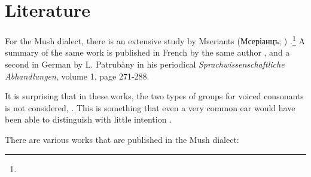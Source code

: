 \section{Literature}

For the Mush dialect, there is an extensive study by Mseriants (Мсеріанцъ; ) \citep{Mseriants-1897-Part1,Mseriants-1901-Part2}.\footnote{} A summary of the same work is published in French by the same author \citep{Mserianz-1899-Mush}, and a second in German by L. Patrubàny in his periodical \textit{Sprachwissenschaftliche Abhandlungen}, volume 1, page 271-288.

It is surprising that in these works, the two types of groups for voiced consonants is not considered, . This is something that even a very common ear  would have been able to distinguish with little intention .

There are various works that are published in the Mush dialect: 

{\litoverview}


